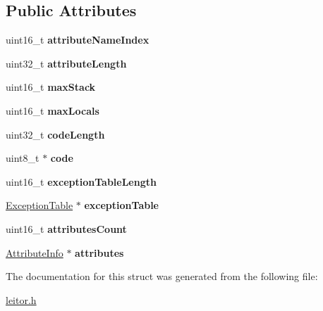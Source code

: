 \subsection*{Public Attributes}
\begin{DoxyCompactItemize}
\item 
\mbox{\label{structCodeAttribute_ad7ee24e03606191ad3f75e919e10d314}} 
uint16\+\_\+t {\bfseries attribute\+Name\+Index}
\item 
\mbox{\label{structCodeAttribute_ad7847fdf04ce98313bf197308db2f3eb}} 
uint32\+\_\+t {\bfseries attribute\+Length}
\item 
\mbox{\label{structCodeAttribute_a909f0678f0621617233e76073a55976a}} 
uint16\+\_\+t {\bfseries max\+Stack}
\item 
\mbox{\label{structCodeAttribute_a8fe52af0bc8aa61d0dbeb8a3a9233731}} 
uint16\+\_\+t {\bfseries max\+Locals}
\item 
\mbox{\label{structCodeAttribute_a56ef08dd29653bdfd922f59dbf3ca619}} 
uint32\+\_\+t {\bfseries code\+Length}
\item 
\mbox{\label{structCodeAttribute_a95d8e9c3e0b93220defcbc9852ec6c27}} 
uint8\+\_\+t $\ast$ {\bfseries code}
\item 
\mbox{\label{structCodeAttribute_adcab31464c6fcea300f5fd171c536591}} 
uint16\+\_\+t {\bfseries exception\+Table\+Length}
\item 
\mbox{\label{structCodeAttribute_a59ef2cc9a1890d0fd0436278ef14c87a}} 
\mbox{\hyperlink{structExceptionTable}{Exception\+Table}} $\ast$ {\bfseries exception\+Table}
\item 
\mbox{\label{structCodeAttribute_ae76ef93751db55059ac434e073178f83}} 
uint16\+\_\+t {\bfseries attributes\+Count}
\item 
\mbox{\label{structCodeAttribute_a99297a4945c876dd5615d84986043c21}} 
\mbox{\hyperlink{structAttributeInfo}{Attribute\+Info}} $\ast$ {\bfseries attributes}
\end{DoxyCompactItemize}


The documentation for this struct was generated from the following file\+:\begin{DoxyCompactItemize}
\item 
\mbox{\hyperlink{leitor_8h}{leitor.\+h}}\end{DoxyCompactItemize}
